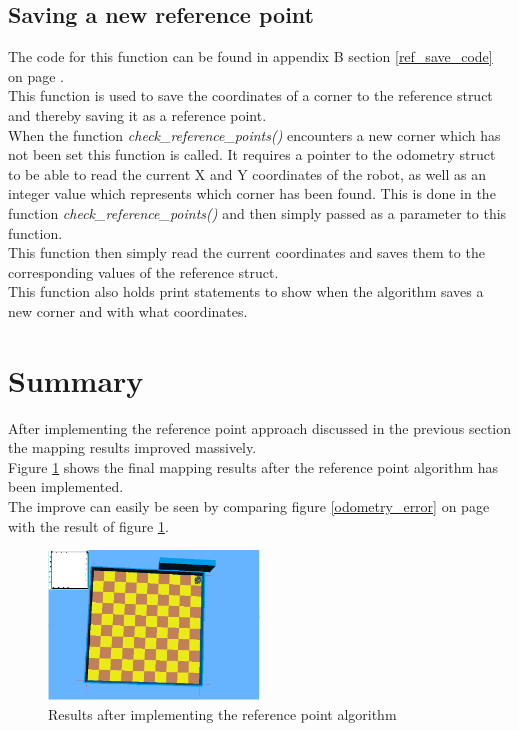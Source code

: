 \subsection{Saving a new reference point}
\label{ref_save_description}
The code for this function can be found in appendix B section \ref{ref_save_code} on page \pageref{ref_save_code}.\\
This function is used to save the coordinates of a corner to the reference struct and thereby saving it as a reference point. \\
When the function \textit{check\_reference\_points()} encounters a new corner which has not been set this function is called. It requires a pointer to the odometry struct to be able to read the current X and Y coordinates of the robot, as well as an integer value which represents which corner has been found. This is done in the function \textit{check\_reference\_points()} and then simply passed as a parameter to this function. \\
This function then simply read the current coordinates and saves them to the corresponding values of the reference struct.\\
This function also holds print statements to show when the algorithm saves a new corner and with what coordinates.

\section{Summary}
After implementing the reference point approach discussed in the previous section the mapping results improved massively.\\
Figure \ref{ref_result} shows the final mapping results after the reference point algorithm has been implemented. \\
The improve can easily be seen by comparing figure \ref{odometry_error} on page \pageref{odometry_error} with the result of figure \ref{ref_result}.

\begin{figure}[h]
\centering
\includegraphics[width = 0.5\textwidth]{../../figures/map_results/result_room1_empty.png}
\caption{Results after implementing the reference point algorithm}
\label{ref_result}
\end{figure}


